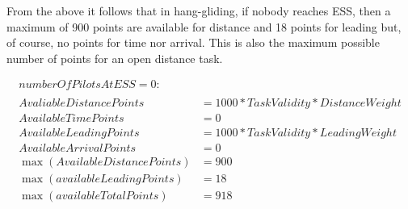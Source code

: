 \documentclass[gap.tex]{subfiles}
\begin{document}
\begin{hg}
From the above it follows that in hang-gliding, if nobody reaches ESS, then
a maximum of 900 points are available for distance and 18 points for leading
but, of course, no points for time nor arrival. This is also the maximum
possible number of points for an open distance task.
\end{hg}

\begin{align*}
    numberOfPilotsAtESS = 0 : \\
    \\
    AvaliableDistancePoints &= 1000 * TaskValidity * DistanceWeight \\
    AvailableTimePoints &= 0 \\
    AvailableLeadingPoints &= 1000 * TaskValidity * LeadingWeight \\
    AvailableArrivalPoints &= 0 \\
    \max(AvailableDistancePoints) &= 900 \\ 
    \max(availableLeadingPoints) &= 18 \\
    \max(availableTotalPoints) &= 918
\end{align*}
\end{document}
